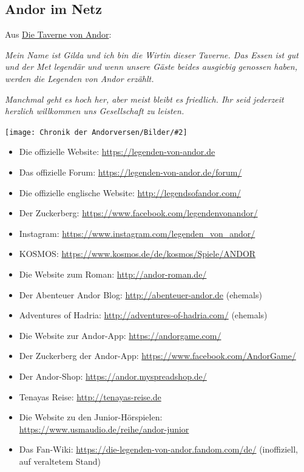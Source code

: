 \documentclass[10pt, a4paper, oneside]{book}
\newcommand{\refprodukt}[1]{\hyperref[Produkt: #1]{#1}}
\newcommand{\bildmitts}[2][height=0.32\textwidth,width=0.48\textwidth,keepaspectratio]{%
    \begin{center}
        \texttt{[image: Chronik der Andorversen/Bilder/\#2]}
    \end{center}
}
\begin{document}
\begin{multicols}{2}



\begin{chapterbox}
    \chapter{Andor im Netz}

    \begin{center}
        Aus \refprodukt{Die Taverne von Andor}:
    \end{center}

    \textit{Mein Name ist Gilda und ich bin die Wirtin dieser Taverne. Das Essen ist gut und der Met legendär und wenn unsere Gäste beides ausgiebig genossen haben, werden die Legenden von Andor erzählt.}

    \textit{Manchmal geht es hoch her, aber meist bleibt es friedlich. Ihr seid jederzeit herzlich willkommen uns Gesellschaft zu leisten.}

    \bildmitts[width=\textwidth]{Taverne von Andor.jpg}
\end{chapterbox}

\extramarks{}{} %

\end{multicols}


\begin{itemize}[topsep=0pt,itemsep=-1ex,partopsep=1ex,parsep=1ex]
    \item Die offizielle Website: \url{https://legenden-von-andor.de}
    \item Das offizielle Forum: \url{https://legenden-von-andor.de/forum/}
    \item Die offizielle englische Website: \url{http://legendsofandor.com/}
    \item Der Zuckerberg: \url{https://www.facebook.com/legendenvonandor/}
    \item Instagram: \url{https://www.instagram.com/legenden_von_andor/}
    \item KOSMOS: \url{https://www.kosmos.de/de/kosmos/Spiele/ANDOR}
    \item Die Website zum Roman: \url{http://andor-roman.de/}
    \item Der Abenteuer Andor Blog: \url{http://abenteuer-andor.de} (ehemals)
    \item Adventures of Hadria: \url{http://adventures-of-hadria.com/} (ehemals)
    \item Die Website zur Andor-App: \url{https://andorgame.com/}
    \item Der Zuckerberg der Andor-App: \url{https://www.facebook.com/AndorGame/}
    \item Der Andor-Shop: \url{https://andor.myspreadshop.de/}
    \item Tenayas Reise: \url{http://tenayas-reise.de}
    \item Die Website zu den Junior-Hörspielen: \url{https://www.usmaudio.de/reihe/andor-junior}
    \item Das Fan-Wiki: \url{https://die-legenden-von-andor.fandom.com/de/} (inoffiziell, auf veraltetem Stand)
\end{itemize}
\end{document}
